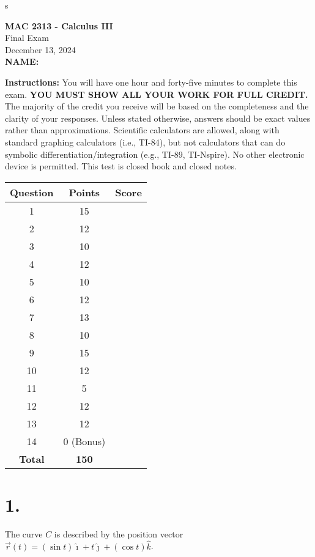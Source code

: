 s\documentclass[12pt]{article}
\begin{document}
\begin{center}
    \Large \textbf{MAC 2313 - Calculus III}\\
    \large Final Exam\\
    \large December 13, 2024\\[1em]
    \normalsize \textbf{NAME:} \underline{\hspace{10cm}}\\[2em]
\end{center}

\noindent\textbf{Instructions:} You will have one hour and forty-five minutes to complete this exam. \textbf{YOU MUST SHOW ALL YOUR WORK FOR FULL CREDIT.} The majority of the credit you receive will be based on the completeness and the clarity of your responses. Unless stated otherwise, answers should be exact values rather than approximations. Scientific calculators are allowed, along with standard graphing calculators (i.e., TI-84), but not calculators that can do symbolic differentiation/integration (e.g., TI-89, TI-Nspire). No other electronic device is permitted. This test is closed book and closed notes.

\vspace{2em}

\begin{tabular}{|c|c|c|}
    \hline
    \textbf{Question} & \textbf{Points} & \textbf{Score} \\
    \hline
    1 & 15 & \\
    2 & 12 & \\
    3 & 10 & \\
    4 & 12 & \\
    5 & 10 & \\
    6 & 12 & \\
    7 & 13 & \\
    8 & 10 & \\
    9 & 15 & \\
    10 & 12 & \\
    11 & 5 & \\
    12 & 12 & \\
    13 & 12 & \\
    14 & 0 (Bonus) & \\
    \hline
    \textbf{Total} & \textbf{150} & \\
    \hline
\end{tabular}

\newpage

\section*{1.}
The curve $C$ is described by the position vector $\vec{r}(t) = (\sin t)\hat{\imath} + t\hat{\jmath} + (\cos t)\hat{k}$.
\end{document}
